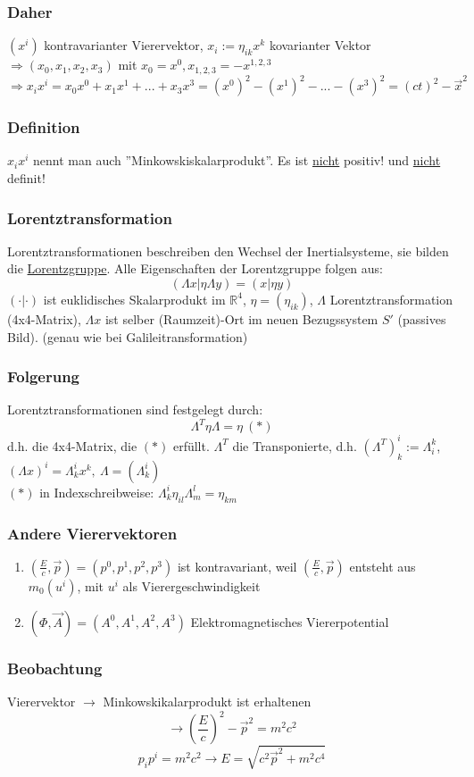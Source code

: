 \documentclass[twoside,a4paper]{scrartcl}
\newcommand{\R}{\mathbb{R}}
\renewcommand{\1}{\mathds{1}}
\newcommand{\Ra}{\Rightarrow}
\newcommand{\ra}{\rightarrow}
\renewcommand{\L}{\Lambda}
\renewcommand{\R}{\mathbb{R}}
\begin{document}
\subsubsection*{Daher}
$(x^i)$ kontravarianter Vierervektor, $x_i:= \eta_{ik}x^k$ kovarianter Vektor\\
$\Ra (x_0,x_1,x_2,x_3)$ mit $x_0=x^0, x_{1,2,3}=-x^{1,2,3}$\\
$\Ra x_ix^i=x_0x^0+x_1x^1+...+x_3x^3=(x^0)^2-(x^1)^2-...-(x^3)^2=(ct)^2-\vec x^2$
\subsubsection*{Definition}
 $x_ix^i$ nennt man auch ''Minkowskiskalarprodukt''. Es ist \underline{nicht} positiv! und \underline{nicht} definit!
\subsubsection*{Lorentztransformation}
Lorentztransformationen beschreiben den Wechsel der Inertialsysteme, sie bilden die \underline{Lorentzgruppe}. Alle Eigenschaften der Lorentzgruppe folgen aus:
$$(\L x|\eta\L y)=(x|\eta y)$$
$(\cdot|\cdot)$ ist euklidisches Skalarprodukt im $\R^4$, $\eta=(\eta_{ik})$, $\L$ Lorentztransformation (4x4-Matrix), $\L x$ ist selber (Raumzeit)-Ort im neuen Bezugssystem $S'$ (passives Bild). (genau wie bei Galileitransformation)
\subsubsection*{Folgerung}
Lorentztransformationen sind festgelegt durch:
$$\L ^T \eta \L = \eta \ (*)$$
d.h. die 4x4-Matrix, die $(*)$ erfüllt. $\L^T$ die Transponierte, d.h. $(\L^T)_k^i:=\L_i^k$, $(\L x)^i=\L_k^i x^k, \ \L=(\L_k^i)$\\
$(*)$ in Indexschreibweise: $\L_k^i \eta_{il} \L_m^l=\eta_{km}$
\subsubsection*{Andere Vierervektoren}
\begin{enumerate}
\item $(\frac{E}{c},\vec p)=(p^0,p^1,p^2,p^3)$ ist kontravariant, weil $(\frac{E}{c},\vec p)$ entsteht aus $m_0(u^i)$, mit $u^i$ als Vierergeschwindigkeit
\item $(\Phi,\vec A)=(A^0,A^1,A^2,A^3)$ Elektromagnetisches Viererpotential
\end{enumerate}
\subsubsection*{Beobachtung}
Vierervektor $\ra$ Minkowskikalarprodukt ist erhaltenen
$$\ra (\frac{E}{c})^2-\vec p^2=m^2c^2$$
$$p_ip^i=m^2c^2 \ra E=\sqrt{c^2\vec p^2+m^2c^4}$$
\end{document}

